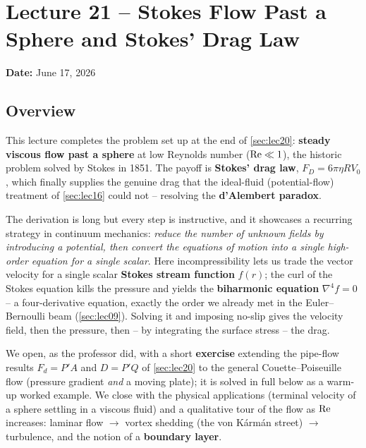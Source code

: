 \documentclass[../main.tex]{subfiles}
\begin{document}
\section{Lecture 21 -- Stokes Flow Past a Sphere and Stokes' Drag Law}\label{sec:lec21}
\begin{center}
  \textbf{Date:} June 17, 2026
\end{center}

\subsection*{Overview}
This lecture completes the problem set up at the end of \cref{sec:lec20}: \textbf{steady viscous flow past a sphere} at low Reynolds number ($\mathrm{Re}\ll1$), the historic problem solved by Stokes in 1851. The payoff is \textbf{Stokes' drag law}, $F_D=6\pi\eta R V_0$, which finally supplies the genuine drag that the ideal-fluid (potential-flow) treatment of \cref{sec:lec16} could not -- resolving the \textbf{d'Alembert paradox}.

The derivation is long but every step is instructive, and it showcases a recurring strategy in continuum mechanics: \emph{reduce the number of unknown fields by introducing a potential, then convert the equations of motion into a single high-order equation for a single scalar}. Here incompressibility lets us trade the vector velocity for a single scalar \textbf{Stokes stream function} $f(r)$; the curl of the Stokes equation kills the pressure and yields the \textbf{biharmonic equation} $\nabla^4 f=0$ -- a four-derivative equation, exactly the order we already met in the Euler--Bernoulli beam (\cref{sec:lec09}). Solving it and imposing no-slip gives the velocity field, then the pressure, then -- by integrating the surface stress -- the drag.

We open, as the professor did, with a short \textbf{exercise} extending the pipe-flow results $F_d=P'A$ and $D=P'Q$ of \cref{sec:lec20} to the general Couette--Poiseuille flow (pressure gradient \emph{and} a moving plate); it is solved in full below as a warm-up worked example. We close with the physical applications (terminal velocity of a sphere settling in a viscous fluid) and a qualitative tour of the flow as $\mathrm{Re}$ increases: laminar flow $\to$ vortex shedding (the von Kármán street) $\to$ turbulence, and the notion of a \textbf{boundary layer}.
\end{document}
